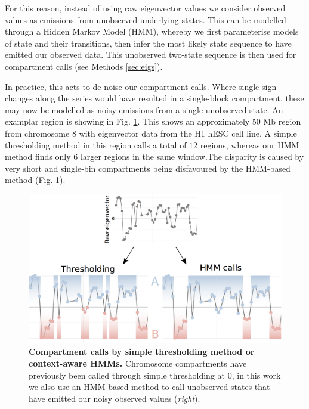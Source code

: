 \documentclass[a4paper,10pt,oneside]{book}
\begin{document}
For this reason, instead of using raw eigenvector values we consider observed values as emissions from unobserved underlying states. This can be modelled through a Hidden Markov Model (HMM), whereby we first parameterise models of state and their transitions, then infer the most likely state sequence to have emitted our observed data. This unobserved two-state sequence is then used for compartment calls (see Methods \ref{sec:eigs}). 

In practice, this acts to de-noise our compartment calls. Where single sign-changes along the series would have resulted in a single-block compartment, these may now be modelled as noisy emissions from a single unobserved state. An examplar region is showing in Fig. \ref{fig:denoise}. This shows an approximately 50 Mb region from chromosome 8 with eigenvector data from the H1 hESC cell line. A simple thresholding method in this region calls a total of $12$ regions, whereas our HMM method finds only $6$ larger regions in the same window.The disparity is caused by very short and single-bin compartments being disfavoured by the HMM-based method (Fig. \ref{fig:denoise}). 

\begin{figure}
\begin{center}
\includegraphics[width=.9\textwidth]{figs/hmm_calls.png}
\captionsetup{width=\textwidth}
\caption{ {\bf Compartment calls by simple thresholding method or context-aware HMMs.}
Chromosome compartments have previously been called through simple thresholding at $0$,\cite{Lieberman2009} in this work we also use an HMM-based method to call unobserved states that have emitted our noisy observed values (\emph{right}).
}\label{fig:denoise}
\end{center}
\end{figure} 
\end{document}
